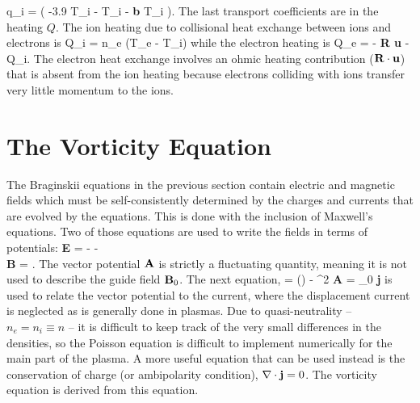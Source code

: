 \beq
\label{ion_heat_flux}
q_i =  \left( -3.9 \gradpar T_i -  \gradperp T_i -  {\bf b \times} \grad T_i \right).
\eeq
The last transport coefficients are in the heating $Q$. The ion heating due to collisional heat exchange between ions and electrons is
\beq
\label{ion_heat_exchange}
Q_i =  n_e \nue (T_e - T_i)
\eeq
while the electron heating is
\beq
\label{electron_heat_exchange}
Q_e = - {\bf R \cdot u} - Q_i.
\eeq
The electron heat exchange involves an ohmic heating contribution (${\bf R \cdot u}$) that is absent from the ion heating because electrons colliding with ions transfer very
little momentum to the ions.

\section{The Vorticity Equation}
\label{s_vorticity_eqn}

The Braginskii equations in the previous section contain electric and magnetic fields which must be self-consistently determined by the charges and currents that are evolved by the equations. 
This is done with the inclusion of Maxwell's equations. Two of those equations are used to write the fields in terms of potentials:
\beqar
\label{gauge}
{\bf E} = - \grad \phi -  \\ \nonumber
{\bf B} = \nabla {}.
\eeqar
The vector potential ${\bf A}$ is strictly a fluctuating quantity, meaning it is not used to describe the guide field ${\bf B}_0$.
The next equation,
\beq
\label{maxwell}
\grad {} = \grad(\grad {}) - \grad^2 {\bf A} = \mu_0 {\bf j}
\eeq
is used to relate the vector potential to the current, where the displacement current is neglected as is generally done in plasmas. Due to quasi-neutrality -- $n_e = n_i \equiv n$ -- 
it is difficult to keep track of the very small differences in the densities, so the Poisson equation is difficult to implement numerically for the main part of the plasma. 
A more useful equation that can be used instead is the conservation of charge (or ambipolarity condition), 
$\nabla \cdot {\bf j} = 0$. The vorticity equation is derived from this equation.

